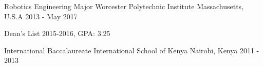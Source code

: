 \vspace{-8pt}
\begin{cventries}
  \cventry
    {Robotics Engineering Major}%
    {Worcester Polytechnic Institute  }
    {Massachusetts, U.S.A}
    {2013 - May 2017}
    {
      \begin{cvitems}
        \item {Dean's List 2015-2016, GPA: 3.25}
      \end{cvitems}
    }
  \space
  \cventry
    {International Baccalaureate}
    {International School of Kenya}
    {Nairobi, Kenya}
    {2011 - 2013}
    {}
\end{cventries}


